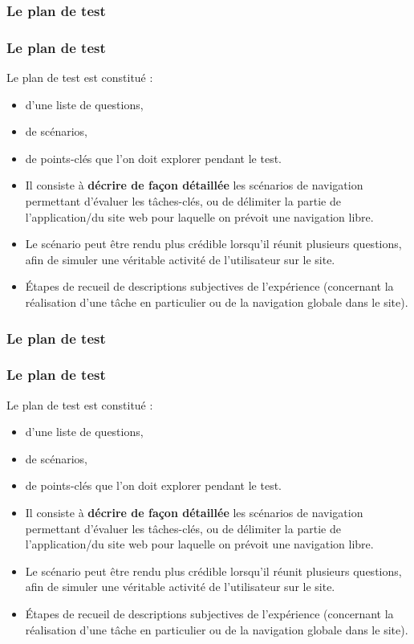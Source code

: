 			
			\subsubsection{Le plan de test} 
			\begin{frame}[allowframebreaks]
			\frametitle{Le plan de test}
				Le plan de test est constitué :
				\begin{itemize}
				\item d’une liste de questions, 
				\item de scénarios, 
				\item de points-clés que l’on doit explorer pendant le test.
				\end{itemize} 
				\framebreak
				\begin{itemize}
				\item Il consiste à \textbf{décrire de façon détaillée} les scénarios de navigation permettant d’évaluer les tâches-clés, ou de délimiter la partie de l’application/du site web pour laquelle on prévoit une navigation libre.
				\item Le scénario peut être rendu plus crédible lorsqu’il réunit plusieurs questions, afin de simuler une véritable activité de l’utilisateur sur le site.
				\item Étapes de recueil de descriptions subjectives de l’expérience (concernant la réalisation d’une tâche en particulier ou de la navigation globale dans le site).
				\end{itemize} 
				\end{frame} 
				
		\subsubsection{Le plan de test} 
			\begin{frame}[allowframebreaks]
			\frametitle{Le plan de test}
				Le plan de test est constitué :
				\begin{itemize}
				\item d’une liste de questions, 
				\item de scénarios, 
				\item de points-clés que l’on doit explorer pendant le test.
				\end{itemize} 
				\framebreak
				\begin {itemize}
				\item Il consiste à \textbf{décrire de façon détaillée} les scénarios de navigation permettant d’évaluer les tâches-clés, ou de délimiter la partie de l’application/du site web pour laquelle on prévoit une navigation libre.
				\item Le scénario peut être rendu plus crédible lorsqu’il réunit plusieurs questions, afin de simuler une véritable activité de l’utilisateur sur le site.
				\item Étapes de recueil de descriptions subjectives de l’expérience (concernant la réalisation d’une tâche en particulier ou de la navigation globale dans le site).
				\end{itemize} 
						
				
			\end{frame} 
			
